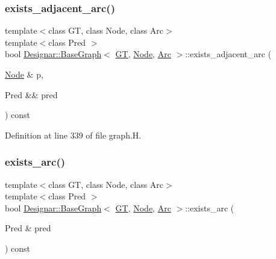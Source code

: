 \subsubsection{\texorpdfstring{exists\+\_\+adjacent\+\_\+arc()}{exists\_adjacent\_arc()}\hspace{0.1cm}{\footnotesize\ttfamily [2/2]}}
{\footnotesize\ttfamily template$<$class GT, class Node, class Arc$>$ \\
template$<$class Pred $>$ \\
bool \hyperlink{class_designar_1_1_base_graph}{Designar\+::\+Base\+Graph}$<$ \hyperlink{demo-buildgraph_8_c_a3001c40d2c31ca87ed96cd7d1334a55e}{GT}, \hyperlink{namespace_designar_a5af326c65aa2bd26b26c410f2030d09e}{Node}, \hyperlink{namespace_designar_a3f55fb5513d62ff47cbc8f72b8e95d6f}{Arc} $>$\+::exists\+\_\+adjacent\+\_\+arc (\begin{DoxyParamCaption}\item[{\hyperlink{namespace_designar_a5af326c65aa2bd26b26c410f2030d09e}{Node} \&}]{p,  }\item[{Pred \&\&}]{pred }\end{DoxyParamCaption}) const\hspace{0.3cm}{\ttfamily [inline]}}



Definition at line 339 of file graph.\+H.

\mbox{\label{class_designar_1_1_base_graph_aaed186c42ed6b51f761cda959ecde601}} 
\subsubsection{\texorpdfstring{exists\+\_\+arc()}{exists\_arc()}\hspace{0.1cm}{\footnotesize\ttfamily [1/2]}}
{\footnotesize\ttfamily template$<$class GT, class Node, class Arc$>$ \\
template$<$class Pred $>$ \\
bool \hyperlink{class_designar_1_1_base_graph}{Designar\+::\+Base\+Graph}$<$ \hyperlink{demo-buildgraph_8_c_a3001c40d2c31ca87ed96cd7d1334a55e}{GT}, \hyperlink{namespace_designar_a5af326c65aa2bd26b26c410f2030d09e}{Node}, \hyperlink{namespace_designar_a3f55fb5513d62ff47cbc8f72b8e95d6f}{Arc} $>$\+::exists\+\_\+arc (\begin{DoxyParamCaption}\item[{Pred \&}]{pred }\end{DoxyParamCaption}) const\hspace{0.3cm}{\ttfamily [inline]}}



